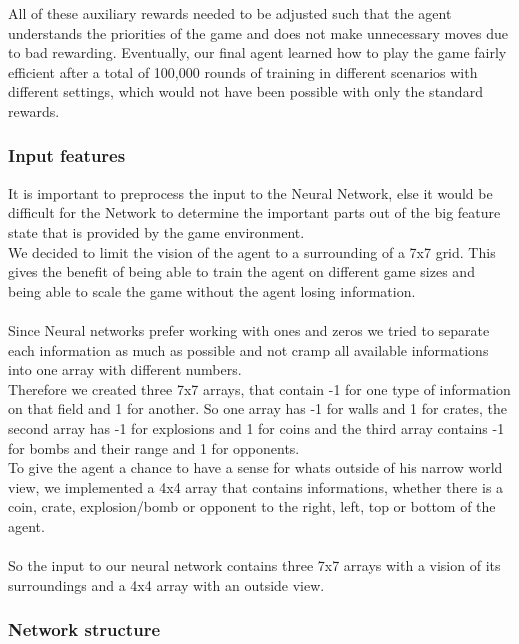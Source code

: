 All of these auxiliary rewards needed to be adjusted such that the agent understands the priorities of the game and does not make unnecessary moves due to bad rewarding. Eventually, our final agent learned how to play the game fairly efficient after a total of 100,000 rounds of training in different scenarios with different settings, which would not have been possible with only the standard rewards.

\newpage
{}
\subsubsection{Input features} \label{InFeatures}
It is important to preprocess the input to the Neural Network, else it would be difficult for the Network to determine the important parts out of the big feature state that is provided by the game environment.\\
We decided to limit the vision of the agent to a surrounding of a 7x7 grid. This gives the benefit of being able to train the agent on different game sizes and being able to scale the game without the agent losing information.\\ \\
Since Neural networks prefer working with ones and zeros we tried to separate each information as much as possible and not cramp all available informations into one array with different numbers.\\
Therefore we created three 7x7 arrays, that contain -1 for one type of information on that field and 1 for another. So one array has -1 for walls and 1 for crates, the second array has -1 for explosions and 1 for coins and the third array contains -1 for bombs and their range and 1 for opponents.\\
To give the agent a chance to have a sense for whats outside of his narrow world view, we implemented a 4x4 array that contains informations, whether there is a coin, crate, explosion/bomb or opponent to the right, left, top or bottom of the agent.\\ \\
So the input to our neural network contains three 7x7 arrays with a vision of its surroundings and a 4x4 array with an outside view.


\subsubsection{Network structure} \label{NetworkS}


